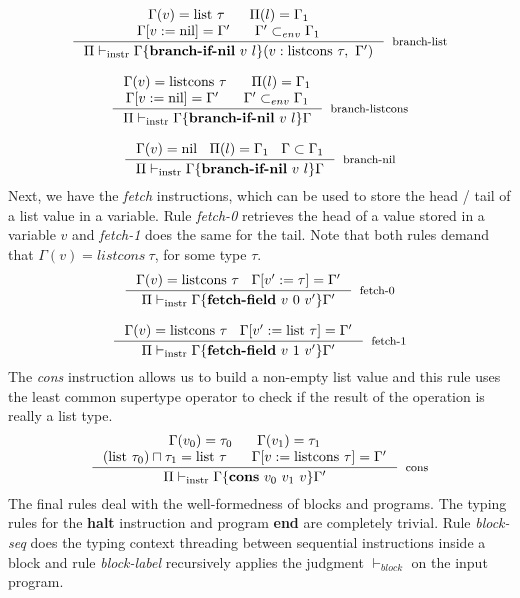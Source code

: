 \documentclass[sigconf]{acmart}
\theoremstyle{definition}
\begin{document}
\[
\begin{array}{c}
\inference{\Gamma(v) = \text{list}~\tau\:\:\:\:\:\:\:\:\Pi(l) = \Gamma_1\\
                     \Gamma[v:=\text{nil}]=\Gamma'\:\:\:\:\:\:\:\:\Gamma' \subset_{env} \Gamma_1}
          {\Pi \vdash_{\text{instr}} \Gamma\{ \textbf{branch-if-nil}~v~l \}(v: \text{listcons}~\tau,~\Gamma')}
          [branch-list]
\\ \\

\inference{\Gamma(v) = \text{listcons}~\tau\:\:\:\:\:\:\:\:\Pi(l) = \Gamma_1\\
           \Gamma[v:=\text{nil}]=\Gamma'\:\:\:\:\:\:\:\:\Gamma' \subset_{env} \Gamma_1}
          {\Pi \vdash_{\text{instr}} \Gamma\{ \textbf{branch-if-nil}~v~l \}\Gamma}[branch-listcons]

\\ \\
\inference{\Gamma(v) = \text{nil}\:\:\:\:\Pi(l) = \Gamma_1\:\:\:\:\Gamma \subset \Gamma_1}
          {\Pi \vdash_{\text{instr}} \Gamma\{ \textbf{branch-if-nil}~v~l \}\Gamma}
          [branch-nil]
\end{array}
\]
Next, we have the \emph{fetch} instructions, which can be used to store the head / tail of a list value in
a variable. Rule \emph{fetch-0} retrieves the head of a value stored in a variable $v$ and \emph{fetch-1}
does the same for the tail. Note that both rules demand that $\Gamma(v) = listcons\:\tau$, for some type
$\tau$.
\[
\begin{array}{c}
\inference{\Gamma(v) = \text{listcons}~\tau\:\:\:\:\Gamma[v':=\tau]=\Gamma'}
          {\Pi \vdash_{\text{instr}} \Gamma\{ \textbf{fetch-field}~v~0~v' \}\Gamma'}[fetch-0]
          \\ \\
\inference{\Gamma(v) = \text{listcons}~\tau\:\:\:\:\Gamma[v':=\text{list}~\tau]=\Gamma'}
          {\Pi \vdash_{\text{instr}} \Gamma\{ \textbf{fetch-field}~v~1~v' \}\Gamma'}[fetch-1]
\end{array}
\]
The \emph{cons} instruction allows us to build a non-empty list value and this rule uses the least
common supertype operator to check if the result of the operation is really a list type.
\[
\inference{\Gamma(v_0) = \tau_0\:\:\:\:\:\:\:\:\Gamma(v_1) = \tau_1 \\
           (\text{list}~\tau_0) \sqcap \tau_1=\text{list}~\tau\:\:\:\:\:\:\:\:\Gamma[v:=\text{listcons}~\tau]=\Gamma'}
          {\Pi \vdash_{\text{instr}} \Gamma\{ \textbf{cons}~v_0~v_1~v \}\Gamma'}[cons]
\]
The final rules deal with the well-formedness of blocks and programs. The typing rules for the \textbf{halt} instruction and
program \textbf{end} are completely trivial. Rule \emph{block-seq} does the typing context threading between sequential
instructions inside a block and rule \emph{block-label} recursively applies the judgment $\vdash_{block}$ on the
input program.
\end{document}
